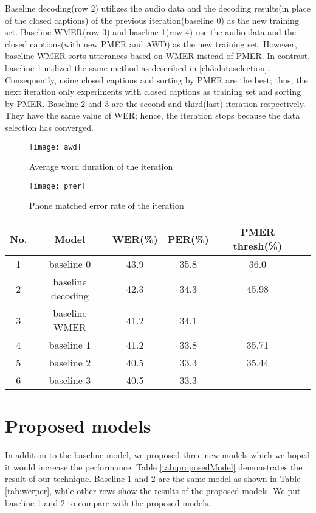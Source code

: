 Baseline decoding(row 2) utilizes the audio data and the decoding results(in place of the closed captions) of the previous iteration(baseline 0) as the new training set. Baseline WMER(row 3) and baseline 1(row 4) use the audio data and the closed captions(with new PMER and AWD) as the new training set. However, baseline WMER sorts utterances based on WMER instead of PMER. In contrast, baseline 1 utilized the same method as described in \ref{ch3:dataselection}. Consequently, using closed captions and sorting by PMER are the best; thus, the next iteration only experiments with closed captions as training set and sorting by PMER. Baseline 2 and 3 are the second and third(last) iteration respectively. They have the same value of WER; hence, the iteration stops because the data selection has converged.

\begin{figure}
\caption{Average word duration of the iteration}
\label{awd}
\texttt{[image: awd]} 
\centering
\end{figure}

\begin{figure}
\caption{Phone matched error rate of the iteration}
\label{pmer}
\texttt{[image: pmer]} 
\centering
\end{figure}


\begin{center}
\label{tab:werper}
\begin{tabular}{| c | c | c | c | c | c |   }
\hline
No. & Model & WER(\%) & PER(\%) & PMER thresh(\%) \\ \hline
1 &  baseline 0 & 43.9 & 35.8 & 36.0  \\ \hline
2 &  baseline decoding & 42.3 & 34.3 & 45.98 \\ \hline
3 &  baseline WMER & 41.2 & 34.1 & \\ \hline
4 &  baseline 1 & 41.2 & 33.8  & 35.71 \\ \hline
5 & baseline 2 & 40.5 & 33.3  & 35.44 \\ \hline
6 & baseline 3 & 40.5 & 33.3  &  \\ \hline
\end{tabular}
\end{center}

\section{Proposed models}

In addition to the baseline model, we proposed three new models which we hoped it would increase the performance. Table \ref{tab:proposedModel} demonstrates the result of our technique. Baseline 1 and 2 are the same model as shown in Table \ref{tab:werper}, while other rows show the results of the proposed models.  We put baseline 1 and 2 to compare with the proposed models.

